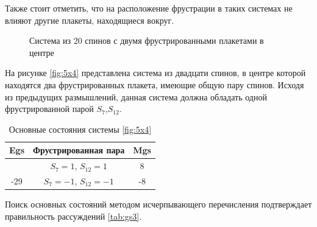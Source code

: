 \documentclass[utf8, babel, sor, jor, amsmath, amssymb, reprint]{elsarticle} %
\begin{document}
Также стоит отметить, что на расположение фрустрации в таких системах  не влияют другие плакеты, находящиеся вокруг.

\begin{figure}[h]
	\centering
	\caption{Система из 20 спинов с двумя фрустрированными плакетами в центре}
	\label{fig:5x4}
\end{figure}

На рисунке \eqref{fig:5x4} представлена система из двадцати спинов, в центре которой находятся два фрустрированных плакета, имеющие общую пару спинов. Исходя из предыдущих размышлений, данная система должна обладать одной фрустрированной парой  $S_7$,$S_12$.

\begin{table}[h]
	\centering
	\begin{tabular}{|c|c|c|}
		\hline
		Egs   &   Фрустрированная пара & Mgs\\
		\hline
		 &  $S_7=1$, $S_{12}=1$ & 8 \\
	\cline{2-3}
		-29	\multirow{3}{*}{}
		  &   $S_7=-1$, $S_{12}=-1$ & -8 \\
		\hline
	\end{tabular}
	\caption{Основные состояния системы \eqref{fig:5x4}}
	\label{tab:gs3}
\end{table}

Поиск основных состояний методом исчерпывающего перечисления подтверждает правильность рассуждений \eqref{tab:gs3}.
\end{document}
